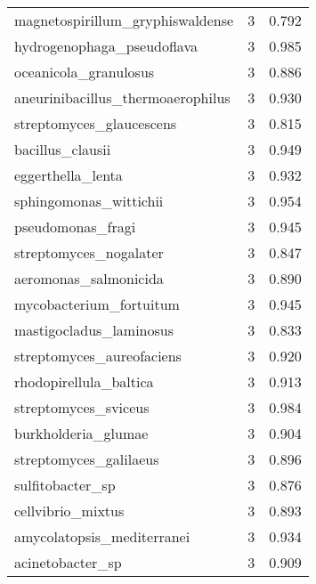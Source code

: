 \begin{tabular}{lrr}
            magnetospirillum\_gryphiswaldense &                   3 &     0.792 \\
                  hydrogenophaga\_pseudoflava &                   3 &     0.985 \\
                       oceanicola\_granulosus &                   3 &     0.886 \\
           aneurinibacillus\_thermoaerophilus &                   3 &     0.930 \\
                    streptomyces\_glaucescens &                   3 &     0.815 \\
                            bacillus\_clausii &                   3 &     0.949 \\
                           eggerthella\_lenta &                   3 &     0.932 \\
                      sphingomonas\_wittichii &                   3 &     0.954 \\
                           pseudomonas\_fragi &                   3 &     0.945 \\
                      streptomyces\_nogalater &                   3 &     0.847 \\
                       aeromonas\_salmonicida &                   3 &     0.890 \\
                     mycobacterium\_fortuitum &                   3 &     0.945 \\
                     mastigocladus\_laminosus &                   3 &     0.833 \\
                   streptomyces\_aureofaciens &                   3 &     0.920 \\
                      rhodopirellula\_baltica &                   3 &     0.913 \\
                        streptomyces\_sviceus &                   3 &     0.984 \\
                         burkholderia\_glumae &                   3 &     0.904 \\
                      streptomyces\_galilaeus &                   3 &     0.896 \\
                            sulfitobacter\_sp &                   3 &     0.876 \\
                           cellvibrio\_mixtus &                   3 &     0.893 \\
                  amycolatopsis\_mediterranei &                   3 &     0.934 \\
                            acinetobacter\_sp &                   3 &     0.909 \\

\end{tabular}
